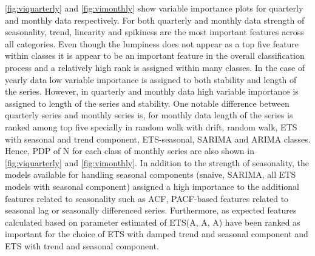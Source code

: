 \documentclass[11pt,a4paper,]{article}
\begin{document}
\autoref{fig:viquarterly} and \autoref{fig:vimonthly} show variable
importance plots for quarterly and monthly data respectively. For both
quarterly and monthly data strength of seasonality, trend, linearity and
spikiness are the most important features across all categories. Even
though the lumpiness does not appear as a top five feature within
classes it is appear to be an important feature in the overall
classification process and a relatively high rank is assigned within
many classes. In the case of yearly data low variable importance is
assigned to both stability and length of the series. However, in
quarterly and monthly data high variable importance is assigned to
length of the series and stability. One notable difference between
quarterly series and monthly series is, for monthly data length of the
series is ranked among top five specially in random walk with drift,
random walk, ETS with seasonal and trend component, ETS-seasonal, SARIMA
and ARIMA classes. Hence, PDP of N for each class of monthly series are
also shown in \autoref{fig:viquarterly} and \autoref{fig:vimonthly}. In
addition to the strength of seasonality, the models available for
handling seasonal components (snaive, SARIMA, all ETS models with
seasonal component) assigned a high importance to the additional
features related to seasonality such as ACF, PACF-based features related
to seasonal lag or seasonally differenced series. Furthermore, as
expected features calculated based on parameter estimated of ETS(A, A,
A) have been ranked as important for the choice of ETS with damped trend
and seasonal component and ETS with trend and seasonal component.
\end{document}
